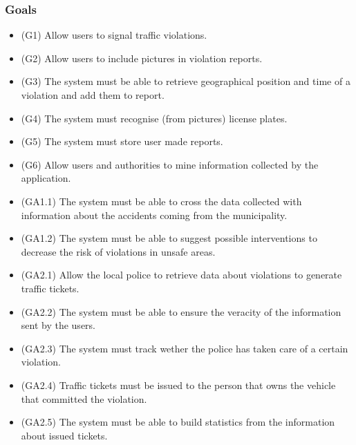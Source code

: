 \subsubsection{Goals}
\begin{itemize}
	\item (G1) 	Allow users to signal traffic violations. \newline	
	\item (G2)	Allow users to include pictures in violation reports. \newline
	\item (G3)	The system must be able to retrieve geographical position and time of a violation and add them to report.\newline
	\item (G4)	The system must recognise (from pictures) license plates.\newline
	\item (G5) 	The system must store user made reports.\newline
	\item (G6)	Allow users and authorities to mine information collected by the application. \newline
	\item (GA1.1)	The system must be able to cross the data collected with information about the accidents coming from the municipality. \newline
	\item (GA1.2)	The system must be able to suggest possible interventions to decrease the risk of violations in unsafe areas. \newline
	\item (GA2.1)	Allow the local police to retrieve data about violations to generate traffic tickets. \newline
	\item (GA2.2)	The system must be able to ensure the veracity of the information sent by the users. \newline
	\item (GA2.3)	The system must track wether the police has taken care of a certain violation. \newline
	\item (GA2.4)	Traffic tickets must be issued to the person that owns the vehicle that committed the violation. \newline
	\item (GA2.5)	The system must be able to build statistics from the information about issued tickets. 
\end{itemize}

